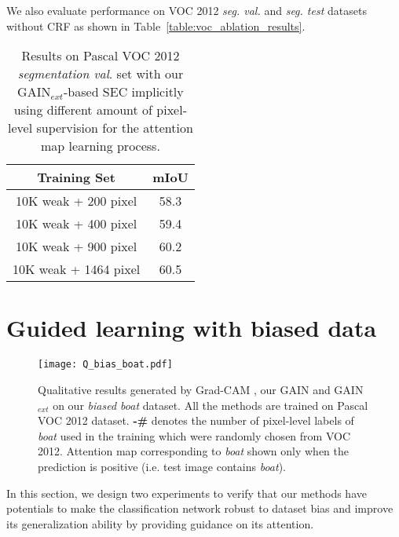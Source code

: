 \documentclass[10pt,twocolumn,letterpaper]{article}
\begin{document}
We also evaluate performance on VOC 2012 \textit{seg. val.} and \textit{seg. test} datasets without CRF as shown in Table~\ref{table:voc_ablation_results}.




\begin{table}
\begin{center}
\begin{tabular}{cc}
\hline
Training Set & mIoU \\
\hline\hline
 10K weak + 200 pixel & 58.3\\
 10K weak + 400 pixel & 59.4\\
 10K weak + 900 pixel & 60.2\\
 10K weak + 1464 pixel & 60.5\\
\hline
\end{tabular}
\end{center}
\caption{Results on Pascal VOC 2012 \emph{segmentation val}. set with our GAIN$_{ext}$-based SEC implicitly using different amount of pixel-level supervision for the attention map learning process.}
\label{table:voc_val_different_percent_supervision}
\end{table}





\section{Guided learning with biased data}\label{section:human_guided_classification_experiment}


\begin{figure*}%
\centering
\texttt{[image: Q\_bias\_boat.pdf]} %
\caption{Qualitative results generated by Grad-CAM \cite{grad-cam}, our GAIN and GAIN$_{ext}$ on our \emph{biased boat} dataset. All the methods are trained on Pascal VOC 2012 dataset. \textbf{-\# } denotes the number of pixel-level labels of \emph{boat} used in the training which were randomly chosen from VOC 2012. Attention map corresponding to \emph{boat} shown only when the prediction is positive (i.e. test image contains \emph{boat}).}
\label{fig:Q_result_bias_boat}
\end{figure*}

In this section, we design two experiments to verify that our methods have potentials to make the classification network robust to dataset bias and improve its generalization ability by providing guidance on its attention.
\end{document}

